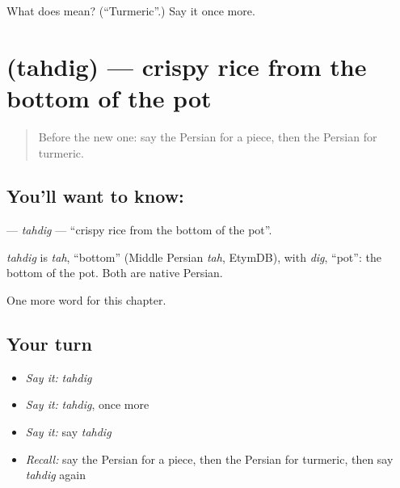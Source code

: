 \begin{tcolorbox}[breakable,colback=teal!4,colframe=teal!35!black,title={Before you move on}]
What does  mean? (\textquotedblleft{}Turmeric\textquotedblright{}.) Say it once more.
\end{tcolorbox}
\section[\texorpdfstring{\fa{ته} \fa{دیگ} (tahdig)}{ته دیگ (tahdig)}]{  (tahdig) — crispy rice from the bottom of the pot}

\label{lesson:FA-C249-tahdig}



\begin{quote}
Before the new one: say the Persian for a piece, then the Persian for turmeric.
\end{quote}

\subsection*{You'll want to know:  }
\textbf{ } — \emph{tahdig} — \textquotedblleft{}crispy rice from the bottom of the pot\textquotedblright{}.

\begin{cousinweb}
\emph{tahdig} is \emph{tah}, \textquotedblleft{}bottom\textquotedblright{} (Middle Persian \emph{tah}, EtymDB), with \emph{dig}, \textquotedblleft{}pot\textquotedblright{}: the bottom of the pot. Both are native Persian.
\end{cousinweb}

\begin{grammarlens}[title={What you've built}]
One more word for this chapter.
\end{grammarlens}

\subsection*{Your turn}
\begin{itemize}
\raggedright
  \item \emph{Say it:} \emph{tahdig}
  \item \emph{Say it:} \emph{tahdig}, once more
  \item \emph{Say it:} say \emph{tahdig}
  \item \emph{Recall:} say the Persian for a piece, then the Persian for turmeric, then say \emph{tahdig} again
\end{itemize}

